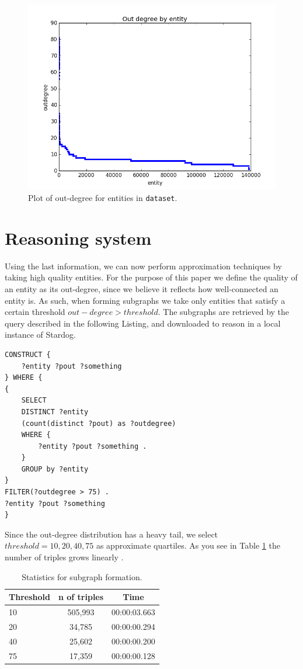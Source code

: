 \documentclass[runningheads,a4paper]{../../StyleFiles/llncs}
\begin{document}
\begin{figure}[h]
	\centering
	\includegraphics[width=.7\textwidth]{img/dataset_outdegree.png}
	\caption{Plot of out-degree for entities in \texttt{dataset}.}
	\label{fig:outdegree}
\end{figure}

\section{Reasoning system}
Using the last information, we can now perform approximation techniques by taking high quality entities. For the purpose of this paper we define the quality of an entity as its out-degree, since we believe it reflects how well-connected an entity is. As such, when forming subgraphs we take only entities that satisfy a certain threshold $ out-degree > threshold$. The subgraphs are retrieved by the query described in the following Listing, and downloaded to reason in a local instance of Stardog.

\begin{lstlisting}[captionpos=b, caption=SPARQL query for calculating out degree of entities, label=lst:sparql, basicstyle=\ttfamily\small,frame=bt]
CONSTRUCT {
	?entity ?pout ?something
} WHERE { 
{
	SELECT
	DISTINCT ?entity
	(count(distinct ?pout) as ?outdegree)
	WHERE {
		?entity ?pout ?something .
	}
	GROUP by ?entity
}
FILTER(?outdegree > 75) .
?entity ?pout ?something
}
\end{lstlisting}

Since the out-degree distribution has a heavy tail, we select $threshold = 10, 20, 40, 75$ as approximate quartiles. As you see in Table \ref{subgraph_table} the number of triples grows linearly .

\begin{table}[h]
	\begin{center}
		\begin{tabular}{| l | c | c |}
			\hline
			\textbf{Threshold} & \textbf{n of triples} & \textbf{Time} \\ \hline
			10 &  505,993 & 00:00:03.663 \\ \hline
			20 & 34,785 & 00:00:00.294 \\ \hline
			40 & 25,602 & 00:00:00.200 \\ \hline
			75 & 17,359 & 00:00:00.128 \\ \hline
		\end{tabular}
		\caption{Statistics for subgraph formation.}
		\label{subgraph_table}
	\end{center}
\end{table}
\end{document}
